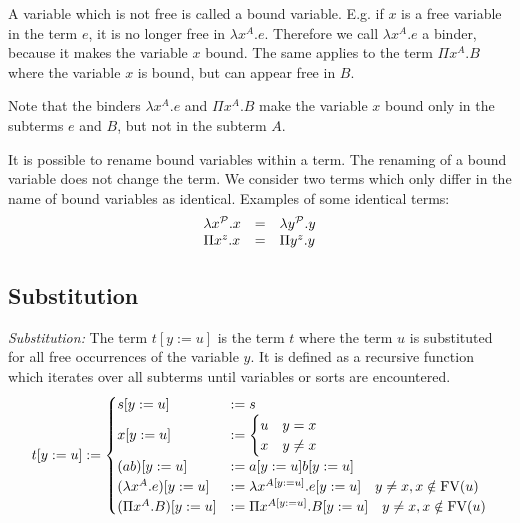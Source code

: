 A variable which is not free is called a bound variable. E.g. if $x$ is a free
variable in the term $e$, it is no longer free in $\lambda x^A. e$. Therefore we
call $\lambda x^A. e$ a binder, because it makes the variable $x$ bound. The
same applies to the term $\Pi x^A. B$  where the variable $x$ is bound, but can
appear free in $B$.

Note that the binders $\lambda x^A. e$ and $\Pi x^A. B$ make the variable $x$
bound only in the subterms $e$ and $B$, but not in the subterm $A$.

It is possible to rename bound variables within a term. The renaming of a bound
variable does not change the term. We consider two terms which only differ in
the name of bound variables as identical. Examples of some identical terms:
$$
\begin{array}{lll}
    \lambda x^\Prop. x  &=& \lambda y^\Prop. y

    \\

    \Pi x^z. x   &=& \Pi y^z. y
\end{array}
$$



\subsection{Substitution}


\begin{definition}
    \emph{Substitution:}
    The term $t[y:=u]$ is the term $t$ where the term $u$ is substituted for all
    free occurrences of the variable $y$. It is defined as a recursive function
    which iterates over all subterms until variables or sorts are encountered.
    $$
    t[y:=u] :=
        \begin{cases}
            s[y:=u] &:= s

            \\

            x[y:=u] &:=
                \begin{cases}
                    u & y = x
                    \\
                    x & y \ne x
                \end{cases}

            \\

            (a b)[y:=u] &:= a[y:=u] b[y:=u]

            \\

            (\lambda x^A . e)[y:=u]
            &:=
            \lambda x^{A[y:=u]}.e[y:=u]
                \quad y \ne x, x \notin \FV(u)

            \\

            (\Pi x^A . B)[y:=u]
            &:=
            \Pi x^{A[y:=u]}. B[y:=u]
                \quad y \ne x, x \notin \FV(u)
        \end{cases}
    $$
\end{definition}

